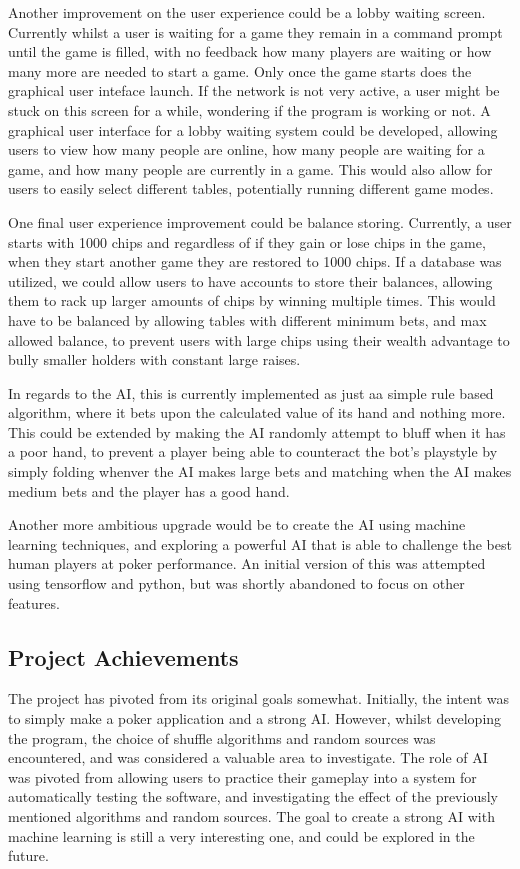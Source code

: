 Another improvement on the user experience could be a lobby waiting screen.
Currently whilst a user is waiting for a game they remain in a command prompt
until the game is filled, with no feedback how many players are waiting or
how many more are needed to start a game. Only once the game starts does the
graphical user inteface launch. If the network is not very active, a user
might be stuck on this screen for a while, wondering if the program is working
or not. A graphical user interface for a lobby waiting system could be
developed, allowing users to view how many people are online, how many
people are waiting for a game, and how many people are currently in a game.
This would also allow for users to easily select different tables, potentially
running different game modes.

One final user experience improvement could be balance storing. Currently,
a user starts with 1000 chips and regardless of if they gain or lose chips
in the game, when they start another game they are restored to 1000 chips.
If a database was utilized, we could allow users to have accounts to store
their balances, allowing them to rack up larger amounts of chips by winning
multiple times. This would have to be balanced by allowing tables with
different minimum bets, and max allowed balance, to prevent users with
large chips using their wealth advantage to bully smaller holders with constant
large raises.

In regards to the AI, this is currently implemented as just aa simple rule
based algorithm, where it bets upon the calculated value of its hand and nothing
more. This could be extended by making the AI randomly attempt to bluff when
it has a poor hand, to prevent a player being able to counteract the bot's
playstyle by simply folding whenver the AI makes large bets and matching when
the AI makes medium bets and the player has a good hand.

Another more ambitious upgrade would be to create the AI using machine learning
techniques, and exploring a powerful AI that is able to challenge the best
human players at poker performance. An initial version of this was attempted
using tensorflow and python, but was shortly abandoned to focus on other
features.

\subsection{Project Achievements}
The project has pivoted from its original goals somewhat. Initially, the intent
was to simply make a poker application and a strong AI\@. However, whilst
developing the program, the choice of shuffle algorithms and random sources
was encountered, and was considered a valuable area to investigate. The
role of AI was pivoted from allowing users to practice their gameplay into
a system for automatically testing the software, and investigating the
effect of the previously mentioned algorithms and random sources. The goal
to create a strong AI with machine learning is still a very interesting one,
and could be explored in the future.
